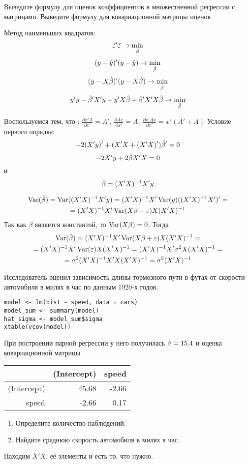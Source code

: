 \begin{problem}
Выведите формулу для оценок коэффициентов в множественной регрессии с матрицами. 
Выведите формулу для ковариационной матрицы оценок.


\begin{sol}

Метод наименьших квадратов:
\[\hat{\varepsilon}'\hat{\varepsilon}\rightarrow \min_{\hat{\beta}}\]
\[(y-\hat{y})'(y-\hat{y})\rightarrow\min_{\hat{\beta}}\]
\[(y-X\hat{\beta})'(y-X\hat{\beta})\rightarrow\min_{\hat{\beta}}\]
\[y'y-\hat{\beta}' X'y-y'X\hat{\beta}+\hat{\beta}'X'X\hat{\beta}\rightarrow\min_{\hat{\beta}}\]

Воспользуемся тем, что : $\frac{\partial x'A}{\partial x'}=A'$, $\frac{\partial Ax}{\partial x'}=A$,
$\frac{\partial x'Ax}{\partial x'}=x'(A'+A)$
Условие первого порядка:
\[-2(X'y)'+(X'X+(X'X)')\hat{\beta}'=0\]
\[-2X'y+2\hat{\beta} X'X=0\]
и
\[\hat{\beta}=(X'X)^{-1}X'y\]

\begin{multline*}
\operatorname{Var}(\hat\beta)=\operatorname{Var}((X'X)^{-1}X'y)=(X'X)^{-1}X'\operatorname{Var}(y)((X'X)^{-1}X')'=\\
=(X'X)^{-1}X'\operatorname{Var}(X\beta+\varepsilon)X(X'X)^{-1}
\end{multline*}
Так как $\beta$ является константой, то $\operatorname{Var}(X\beta)=0$. Тогда
\begin{multline*}
\operatorname{Var}(\hat\beta)=(X'X)^{-1}X'\operatorname{Var}(X\beta+\varepsilon)X(X'X)^{-1}=\\=(X'X)^{-1}X'\operatorname{Var}(\varepsilon)X(X'X)^{-1}=
(X'X)^{-1}X'\sigma^2X(X'X)^{-1}=\\=\sigma^2(X'X)^{-1}X'X(X'X)^{-1}=\sigma^2(X'X)^{-1}
\end{multline*}
\end{sol}
\end{problem}


\begin{problem}
Исследователь оценил зависимость длины тормозного пути в футах от скорости автомобиля в милях в час по данным 1920-х годов.

\begin{verbatim}
model <- lm(dist ~ speed, data = cars)
model_sum <- summary(model)
hat_sigma <- model_sum$sigma
xtable(vcov(model))
\end{verbatim}


При построении парной регрессии у него получилась $\hat{\sigma}=15.4$ и оценка ковариационной матрицы

\begin{tabular}{rrr}
  \hline
 & (Intercept) & speed \\
  \hline
(Intercept) & 45.68 & -2.66 \\
  speed & -2.66 & 0.17 \\
   \hline
\end{tabular}


\begin{enumerate}
\item Определите количество наблюдений.
\item Найдите среднюю скорость автомобиля в милях в час.
\end{enumerate}


\begin{sol}
Находим $X'X$, её элементы и есть то, что нужно.
\end{sol}
\end{problem}




